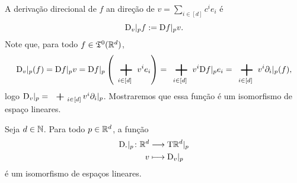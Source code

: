 A derivação direcional de $f$ an direção de $v=\sum_{i \in [d]} c^i e_i$ é
	\begin{equation*}
	\mathrm{D}_v|_p f := \mathrm{D} f|_p v.
	\end{equation*}
Note que, para todo $f \in \mathfrak{T}^0(\mathbb{R}^d)$,
	\begin{align*}
	\D_v|_p (f) = \D f|_p v = \D f|_p \left( \sum_{i \in [d]} v^ie_i \right)  = \sum_{i \in [d]} v^i \D f|_p e_i = \sum_{i \in [d]} v^i \partial_i|_p (f),
	\end{align*}
logo $\D_v|_p = \sum_{i \in [d]} v^i \partial_i|_p$. Mostraremos que essa função é um isomorfismo de espaço lineares.

\begin{proposition}
Seja $d \in \mathbb{N}$. Para todo $p \in \mathbb{R}^d$, a função
	\begin{align*}
	{\mathrm{D}_{\bm{\cdot}}|_p}\colon {\mathbb{R}^d} &\longrightarrow {\mathrm{T}\mathbb{R}^d|_p} \\{v} &\longmapsto \mathrm{D}_v|_p
	\end{align*}
é um isomorfismo de espaços lineares.
\end{proposition}
